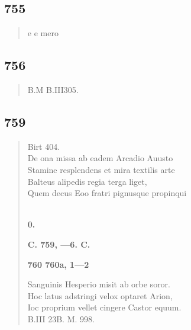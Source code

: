 \documentclass[11pt, a4paper]{report}
\begin{document}
            \subsection*{755}
      \begin{verse}
      e e mero \\ 
      \end{verse}
  
            \subsection*{756}
      \begin{verse}
      B.M B.III305. \\ 
      \end{verse}
  
            \subsection*{759}
      \begin{verse}
      Birt 404. \\ De ona missa ab eadem Arcadio Auusto \\ Stamine resplendens et mira textilis arte \\ Balteus alipedis regia terga liget, \\ Quem decus Eoo fratri pignusque propinqui \\ 
        ﻿\pagebreak 
    \begin{center} \textbf{0.} \end{center}\begin{center} \textbf{C. 759, —6. C.} \end{center}\begin{center} \textbf{760 760a, 1—2} \end{center}Sanguinis Hesperio misit ab orbe soror. \\ Hoc latus adstringi velox optaret Arion, \\ Ioc proprium vellet cingere Castor equum. \\ B.III 23B. M. 998. \\ 
      \end{verse}
  
\end{document}
